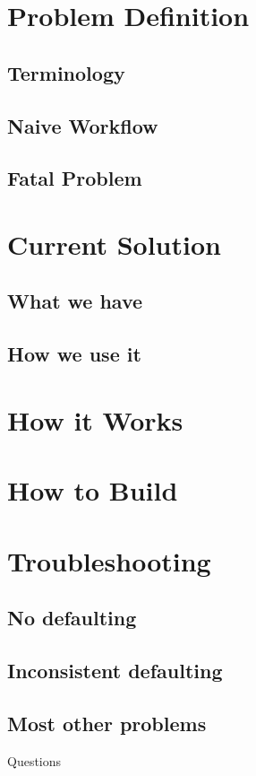 \documentclass{beamer}
\begin{document}
\section{Problem Definition}
\subsection{Terminology}
\subsection{Naive Workflow}
\subsection{Fatal Problem}
\section{Current Solution}
\subsection{What we have}
\subsection{How we use it}
\section{How it Works}
\section{How to Build}
\section{Troubleshooting}
\subsection{No defaulting}
\subsection{Inconsistent defaulting}
\subsection{Most other problems}

\begin{frame}{Questions}
    \begin{columns}[onlytextwidth,T]
        \begin{column}{.45\textwidth}
            \tableofcontents[sections=1-2]
        \end{column}
        \begin{column}{.45\textwidth}
            \tableofcontents[sections=3-5]
        \end{column}
    \end{columns}
\end{frame}
\end{document}
